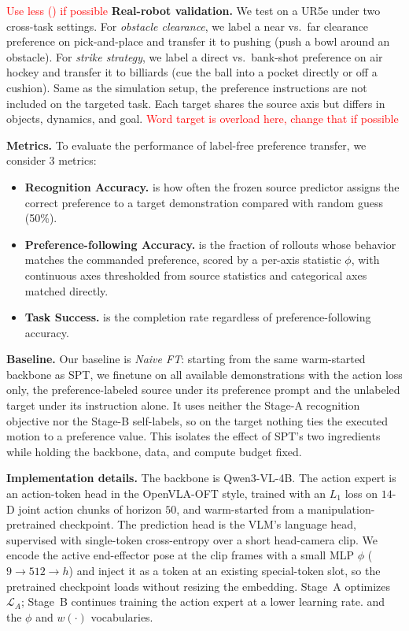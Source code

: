 \documentclass{article}
\begin{document}
\textcolor{red}{Use less () if possible}
\textbf{Real-robot validation.}
We test on a UR5e under two cross-task settings. 
For \emph{obstacle clearance}, we label a near vs.\ far clearance preference on pick-and-place and transfer it to pushing (push a bowl around an obstacle). 
For \emph{strike strategy}, we label a direct vs.\ bank-shot preference on air hockey and transfer it to billiards (cue the ball into a pocket directly or off a cushion). Same as the simulation setup, the preference instructions are not included on the targeted task. 
Each target shares the source axis but differs in objects, dynamics, and goal. \textcolor{red}{Word target is overload here, change that if possible}

\textbf{Metrics.}
To evaluate the performance of label-free preference transfer, we consider 3 metrics:
\begin{itemize}
    \item \textbf{Recognition Accuracy.} is how often the frozen source predictor assigns the correct preference to a target demonstration compared with random guess (50\%).
    \item \textbf{Preference-following Accuracy.} is the fraction of rollouts whose behavior matches the commanded preference, scored by a per-axis statistic $\phi$, with continuous axes thresholded from source statistics and categorical axes matched directly. 
    \item \textbf{Task Success.} is the completion rate regardless of preference-following accuracy.
\end{itemize}

\textbf{Baseline.}
Our baseline is \emph{Naive FT}: starting from the same warm-started backbone as
SPT, we finetune on all available demonstrations with the action loss only, the
preference-labeled source under its preference prompt and the unlabeled target
under its instruction alone. It uses neither the Stage-A recognition objective
nor the Stage-B self-labels, so on the target nothing ties the executed motion to
a preference value. This isolates the effect of SPT's two ingredients while
holding the backbone, data, and compute budget fixed.








\textbf{Implementation details.}
The backbone is Qwen3-VL-4B. 
The action expert is an action-token head in the OpenVLA-OFT style, trained with an $L_1$ loss on $14$-D joint action chunks of horizon $50$, and warm-started from a manipulation-pretrained checkpoint. 
The prediction head is the VLM's language head, supervised with single-token cross-entropy over a short head-camera clip. 
We encode the active end-effector pose at the clip frames with a small MLP $\phi$ ($9\!\to\!512\!\to\!h$) and inject it as a token at an existing special-token slot, so the pretrained checkpoint loads without resizing the embedding. 
Stage~A optimizes $\mathcal{L}_A$; Stage~B continues training the action expert at a lower learning rate.  and the $\phi$ and $w(\cdot)$ vocabularies.
\end{document}
